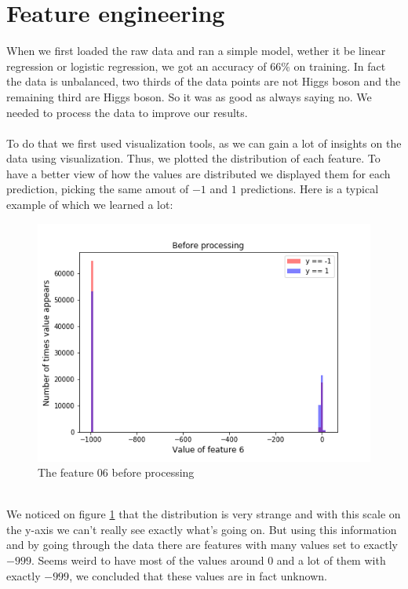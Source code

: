 \documentclass[10pt,conference,compsocconf]{IEEEtran}
\begin{document}
\section{Feature engineering}
When we first loaded the raw data and ran a simple model, wether it be linear regression or logistic regression, we got an accuracy of $66\%$ on training. In fact the data is unbalanced, two thirds of the data points are not Higgs boson and the remaining third are Higgs boson. So it was as good as always saying no. We needed to process the data to improve our results. \\\\
To do that we first used visualization tools, as we can gain a lot of insights on the data using visualization. Thus, we plotted the distribution of each feature. To have a better view of how the values are distributed we displayed them for each prediction, picking the same amout of $-1$ and $1$ predictions. Here is a typical example of which we learned a lot:
\begin{figure}[h!]
  \centering
  \includegraphics[width=\columnwidth]{graph-features/feature-06-raw.png}
  \caption{The feature 06 before processing}
	\label{fig:feature-06-raw}
\end{figure} \\
We noticed on figure \ref{fig:feature-06-raw} that the distribution is very strange and with this scale on the y-axis we can't really see exactly what's going on. But using this information and by going through the data there are features with many values set to exactly $-999$. Seems weird to have most of the values around 0 and a lot of them with exactly $-999$, we concluded that these values are in fact unknown.\\\\
\end{document}
